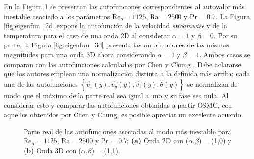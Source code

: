 En la Figura \ref{fig:eigenfun_valid} se presentan las autofunciones correspondientes al autovalor más inestable asociado a los parámetros $\text{Re}_o=1125$, $\text{Ra}=2500$ y Pr = 0.7. La Figura \ref{fig:eigenfun_2d} expone la autofunción de la velocidad \textit{streamwise} y de la temperatura para el caso de una onda 2D al considerar $\alpha=1$ y $\beta=0$. Por su parte, la Figura \ref{fig:eigenfun_3d} presenta las autofunciones de las mismas magnitudes para una onda 3D ahora considerando $\alpha=1$ y $\beta=1$. Ambos casos se comparan con las autofunciones calculadas por Chen y Chung \cite{chen2003direct}. Debe aclararse que los autores emplean una normalización distinta a la definida más arriba: cada una de las autofunciones $\left\lbrace \widehat{v_x}(y), \widehat{v_y}(y), \widehat{v_z}(y), \widehat{\theta}(y) \right\rbrace$ se normalizan de modo que el máximo de la parte real sea igual a uno y su fase sea nula. Al considerar esto y comparar las autofunciones obtenidas a partir OSMC, con aquellos obtenidos por Chen y Chung, es posible apreciar un excelente acuerdo.

\begin{figure}[H]
 \centering
 	\caption{Parte real de las autofunciones asociadas al modo más inestable para $\text{Re}_o=1125$, $\text{Ra}=2500$ y Pr = 0.7; \textbf{(a)} Onda 2D con ($\alpha$,$\beta$) = (1,0) y \textbf{(b)} Onda 3D con ($\alpha$,$\beta$) = (1,1).} 
 \label{fig:eigenfun_valid}
\end{figure}

